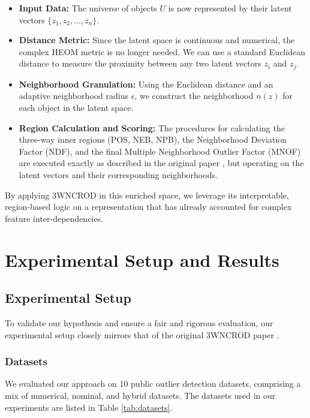 \documentclass[12pt,a4paper]{article}
\begin{document}
\begin{itemize}
\item \textbf{Input Data:} The universe of objects $U$ is now represented by their latent vectors $\{z_1, z_2, \ldots, z_n\}$.

\item \textbf{Distance Metric:} Since the latent space is continuous and numerical, the complex HEOM metric is no longer needed. We can use a standard Euclidean distance to measure the proximity between any two latent vectors $z_i$ and $z_j$.

\item \textbf{Neighborhood Granulation:} Using the Euclidean distance and an adaptive neighborhood radius $\epsilon$, we construct the neighborhood $n(z)$ for each object in the latent space.

\item \textbf{Region Calculation and Scoring:} The procedures for calculating the three-way inner regions (POS, NEB, NPB), the Neighborhood Deviation Factor (NDF), and the final Multiple Neighborhood Outlier Factor (MNOF) are executed exactly as described in the original paper \cite{zhang2024}, but operating on the latent vectors and their corresponding neighborhoods.
\end{itemize}

By applying 3WNCROD in this enriched space, we leverage its interpretable, region-based logic on a representation that has already accounted for complex feature inter-dependencies.

\section{Experimental Setup and Results}

\subsection{Experimental Setup}

To validate our hypothesis and ensure a fair and rigorous evaluation, our experimental setup closely mirrors that of the original 3WNCROD paper \cite{zhang2024}.

\subsubsection{Datasets}

We evaluated our approach on 10 public outlier detection datasets, comprising a mix of numerical, nominal, and hybrid datasets. The datasets used in our experiments are listed in Table \ref{tab:datasets}.
\end{document}
